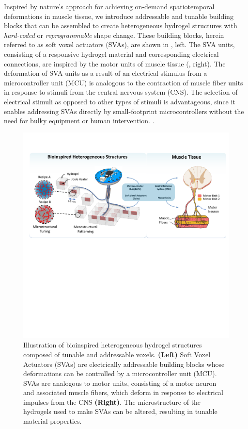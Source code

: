 Inspired by nature's approach for achieving on-demand spatiotemporal deformations in muscle tissue, we introduce addressable and tunable building blocks that can be assembled to create heterogeneous hydrogel structures with \textit{hard-coded} or \textit{reprogrammable} shape change. These building blocks, herein referred to as soft voxel actuators (SVAs), are shown in , left. The SVA units, consisting of a responsive hydrogel material and corresponding electrical connections, are inspired by the motor units of muscle tissue (, right).
The deformation of SVA units as a result of an electrical stimulus from a microcontroller unit (MCU) is analogous to the contraction of muscle fiber units in response to stimuli from the central nervous system (CNS).
The selection of electrical stimuli as opposed to other types of stimuli is advantageous, since it enables addressing SVAs directly by small-footprint microcontrollers without the need for bulky equipment or human intervention. .\\
\begin{figure}[!ht]
\centering
\includegraphics[width=\textwidth]{analogy.pdf}
\caption[Analogy between biology and artificial systems]{Illustration of bioinspired heterogeneous hydrogel structures composed of tunable and addressable voxels. \textbf{(Left)} Soft Voxel Actuators (SVAs) are electrically addressable building blocks whose deformations can be controlled by a microcontroller unit (MCU). SVAs are analogous to motor units, consisting of a motor neuron and associated muscle fibers, which deform in response to electrical impulses from the CNS \textbf{(Right)}. The microstructure of the hydrogels used to make SVAs can be altered, resulting in tunable material properties.}
\label{fig:analogy}
\end{figure}

